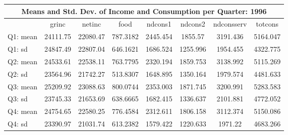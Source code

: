 \begin{tabular}{l*{7}{c}}
\hline\hline
\multicolumn{8}{c}{Means and Std. Dev. of Income and Consumption per Quarter: 1996}  \\
\hline    
            &       grinc&      netinc&        food&     ndcons1&     ndcons2&  ndconsserv&     totcons\\
\hline
Q1: mean     &    24111.75&    22080.47&    787.3182&    2445.454&     1855.57&    3191.436&    5164.047\\
Q1: sd  &    24847.49&    22807.04&    646.1621&    1686.524&    1255.996&    1954.455&    4322.775\\
Q2: mean   &    24533.61&    22538.11&    763.7795&    2320.194&    1859.753&    3138.992&    5115.269\\
Q2: sd  &    23564.96&    21742.27&    513.8307&    1648.895&    1350.164&    1979.574&    4481.633\\
Q3: mean   &    25209.92&    23088.63&    800.0744&    2353.003&    1871.745&    3200.991&    5283.583\\
Q3: sd  &    23745.33&    21653.69&    638.6665&    1682.415&    1336.637&    2101.881&    4772.052\\
Q4: mean   &    24754.65&    22580.25&    776.4584&    2312.611&    1806.158&    3112.374&    5150.086\\
Q4: sd  &    23390.97&    21031.74&    613.2382&    1579.422&    1220.633&     1971.22&    4683.266\\
\hline\hline
\end{tabular}
